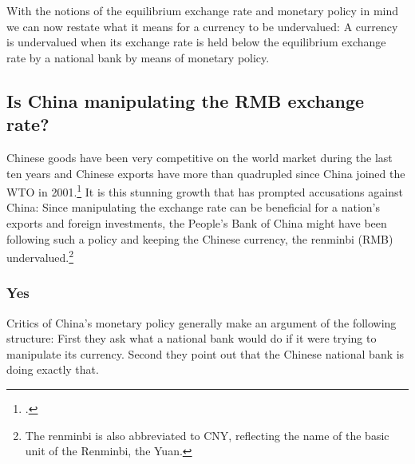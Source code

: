 
With the notions of the equilibrium exchange rate and monetary policy in mind we can now restate what it means for a currency to be undervalued: A currency is undervalued when its exchange rate is held below the equilibrium exchange rate by a national bank by means of monetary policy.

\subsection{Is China manipulating the RMB exchange rate?}

Chinese goods have been very competitive on the world market during the last ten years and Chinese exports have more than quadrupled since China joined the WTO in 2001.\footnote{\cite{FRED2012}.} It is this stunning growth that has prompted accusations against China: Since manipulating the exchange rate can be beneficial for a nation’s exports and foreign investments, the People's Bank of China might have been following such a policy and keeping the Chinese currency, the renminbi (RMB) undervalued.\footnote{The renminbi is also abbreviated to CNY, reflecting the name of  the basic unit of the Renminbi, the Yuan.}

\subsubsection{Yes}

Critics of China's monetary policy generally make an argument of the following structure: First
they ask what a national bank would do if 
it were trying to manipulate its currency. Second they point out that the Chinese national bank is doing exactly that. 

